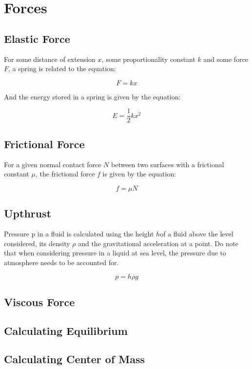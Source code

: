 \documentclass[../main]{subfiles}
\begin{document}
\section{Forces}

	\subsection{Elastic Force}


	For some distance of extension \(x\), some proportionality constant \(k\) and some force \(F\), a spring is related to the equation:

	\[ F = kx \]

	And the energy stored in a spring is given by the equation:

	\[ E = \frac{1}{2}kx^2 \]

	\subsection{Frictional Force}


	For a given normal contact force \(N\) between two surfaces with a frictional constant \(\mu\), the frictional force \(f\) is given by the equation:

	\[ f = \mu N \]

	\subsection{Upthrust}




	Pressure p in a fluid is calculated using the height \(h\)of a fluid above the level considered, its density \(\rho\) and the gravitational acceleration at a point. Do note that when considering pressure in a liquid at sea level, the pressure due to atmosphere needs to be accounted for.

	\[ p = h \rho g \]

	\subsection{Viscous Force}

	\subsection{Calculating Equilibrium}

	\subsection{Calculating Center of Mass}
\end{document}
